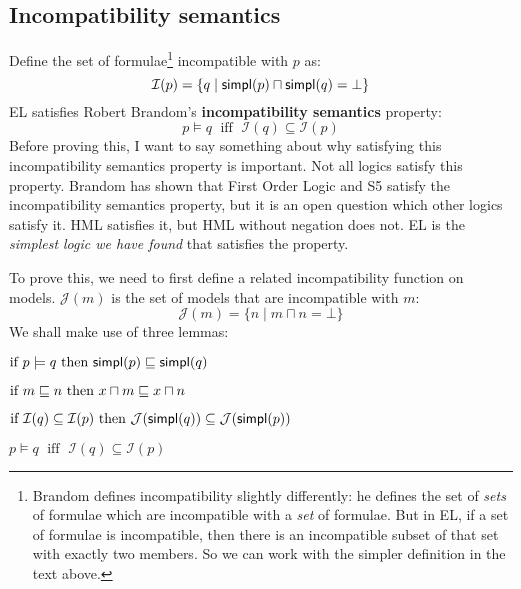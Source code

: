 \subsection{Incompatibility semantics}\label{incompatibility}

\NI Define the set of formulae\footnote{Brandom \cite{brandom} defines
  incompatibility slightly differently: he defines the set of
  \emph{sets} of formulae which are incompatible with a \emph{set} of
  formulae.  But in EL, if a set of formulae is incompatible, then
  there is an incompatible subset of that set with exactly two
  members.  So we can work with the simpler definition in the text
  above.}  incompatible with $p$ as:
\[
\mathcal{I}(p) = \{ q \; | \; \mathsf{simpl}(p) \sqcap \mathsf{simpl}(q) = \bot \}
\]
EL satisfies Robert Brandom's \textbf{incompatibility semantics}  property:
\[
p \models q \; \mbox{ iff } \; \mathcal{I}(q) \subseteq \mathcal{I}(p)
\]
Before proving this, I want to say something about why satisfying this incompatibility semantics property is important.
Not all logics satisfy this property. 
Brandom has shown that First Order Logic and S5 satisfy the incompatibility semantics property, but it is an open question which other logics satisfy it.
HML satisfies it, but HML without negation does not.
EL is the \emph{simplest logic we have found} that satisfies the property.

To prove this, we need to first define a related incompatibility function on  models.
$\mathcal{J}(m)$ is the set of models that are incompatible with $m$:
\[
\mathcal{J}(m) = \{ n \; | \; m \sqcap n = \bot \}
\]
We shall make use of three lemmas:
\begin{lemma}
$\mbox{if }p \models q \mbox{ then } \mathsf{simpl}(p) \sqsubseteq \mathsf{simpl}(q)$
\end{lemma}
\begin{lemma}
$\mbox{if }m \sqsubseteq n \mbox{ then } x \sqcap m \sqsubseteq x \sqcap n$
\end{lemma}
\begin{lemma}
$\mbox{if }\mathcal{I}(q) \subseteq \mathcal{I}(p) \mbox{ then } \mathcal{J}(\mathsf{simpl}(q)) \subseteq \mathcal{J}(\mathsf{simpl}(p))$
\end{lemma}

\begin{theorem}
$p \models q \; \mbox{ iff } \; \mathcal{I}(q) \subseteq \mathcal{I}(p)$
\end{theorem}

